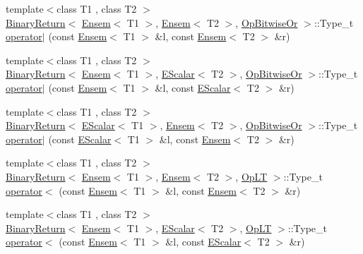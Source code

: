 \begin{DoxyCompactItemize}
\item 
{\footnotesize template$<$class T1 , class T2 $>$ }\\\mbox{\hyperlink{structENSEM_1_1BinaryReturn}{Binary\+Return}}$<$ \mbox{\hyperlink{classENSEM_1_1Ensem}{Ensem}}$<$ T1 $>$, \mbox{\hyperlink{classENSEM_1_1Ensem}{Ensem}}$<$ T2 $>$, \mbox{\hyperlink{structENSEM_1_1OpBitwiseOr}{Op\+Bitwise\+Or}} $>$\+::Type\+\_\+t \mbox{\hyperlink{group__eensem_ga535dbb02f2bee6036e22a754b7144be1}{operator$\vert$}} (const \mbox{\hyperlink{classENSEM_1_1Ensem}{Ensem}}$<$ T1 $>$ \&l, const \mbox{\hyperlink{classENSEM_1_1Ensem}{Ensem}}$<$ T2 $>$ \&r)
\item 
{\footnotesize template$<$class T1 , class T2 $>$ }\\\mbox{\hyperlink{structENSEM_1_1BinaryReturn}{Binary\+Return}}$<$ \mbox{\hyperlink{classENSEM_1_1Ensem}{Ensem}}$<$ T1 $>$, \mbox{\hyperlink{classENSEM_1_1EScalar}{E\+Scalar}}$<$ T2 $>$, \mbox{\hyperlink{structENSEM_1_1OpBitwiseOr}{Op\+Bitwise\+Or}} $>$\+::Type\+\_\+t \mbox{\hyperlink{group__eensem_gadd9d57d20a2060d811fba3899bcfcd73}{operator$\vert$}} (const \mbox{\hyperlink{classENSEM_1_1Ensem}{Ensem}}$<$ T1 $>$ \&l, const \mbox{\hyperlink{classENSEM_1_1EScalar}{E\+Scalar}}$<$ T2 $>$ \&r)
\item 
{\footnotesize template$<$class T1 , class T2 $>$ }\\\mbox{\hyperlink{structENSEM_1_1BinaryReturn}{Binary\+Return}}$<$ \mbox{\hyperlink{classENSEM_1_1EScalar}{E\+Scalar}}$<$ T1 $>$, \mbox{\hyperlink{classENSEM_1_1Ensem}{Ensem}}$<$ T2 $>$, \mbox{\hyperlink{structENSEM_1_1OpBitwiseOr}{Op\+Bitwise\+Or}} $>$\+::Type\+\_\+t \mbox{\hyperlink{group__eensem_gacc25f74aa29769c6afffde4164c7821c}{operator$\vert$}} (const \mbox{\hyperlink{classENSEM_1_1EScalar}{E\+Scalar}}$<$ T1 $>$ \&l, const \mbox{\hyperlink{classENSEM_1_1Ensem}{Ensem}}$<$ T2 $>$ \&r)
\item 
{\footnotesize template$<$class T1 , class T2 $>$ }\\\mbox{\hyperlink{structENSEM_1_1BinaryReturn}{Binary\+Return}}$<$ \mbox{\hyperlink{classENSEM_1_1Ensem}{Ensem}}$<$ T1 $>$, \mbox{\hyperlink{classENSEM_1_1Ensem}{Ensem}}$<$ T2 $>$, \mbox{\hyperlink{structENSEM_1_1OpLT}{Op\+LT}} $>$\+::Type\+\_\+t \mbox{\hyperlink{group__eensem_ga1d5f68e8b9ac25bf882bfdfda50cf24b}{operator$<$}} (const \mbox{\hyperlink{classENSEM_1_1Ensem}{Ensem}}$<$ T1 $>$ \&l, const \mbox{\hyperlink{classENSEM_1_1Ensem}{Ensem}}$<$ T2 $>$ \&r)
\item 
{\footnotesize template$<$class T1 , class T2 $>$ }\\\mbox{\hyperlink{structENSEM_1_1BinaryReturn}{Binary\+Return}}$<$ \mbox{\hyperlink{classENSEM_1_1Ensem}{Ensem}}$<$ T1 $>$, \mbox{\hyperlink{classENSEM_1_1EScalar}{E\+Scalar}}$<$ T2 $>$, \mbox{\hyperlink{structENSEM_1_1OpLT}{Op\+LT}} $>$\+::Type\+\_\+t \mbox{\hyperlink{group__eensem_ga4f6f9b0944034ade90afab94b38db470}{operator$<$}} (const \mbox{\hyperlink{classENSEM_1_1Ensem}{Ensem}}$<$ T1 $>$ \&l, const \mbox{\hyperlink{classENSEM_1_1EScalar}{E\+Scalar}}$<$ T2 $>$ \&r)

\end{DoxyCompactItemize}
